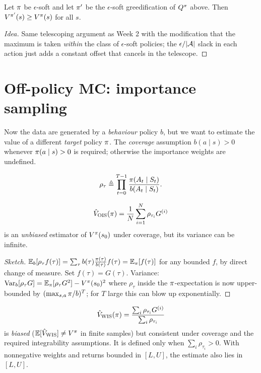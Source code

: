 \documentclass[11pt,oneside]{scrbook}
\begin{document}
\begin{theorem}
Let $\pi$ be $\epsilon$-soft and let $\pi'$ be the $\epsilon$-soft
greedification of $Q^\pi$ above. Then $V^{\pi'}(s) \ge V^\pi(s)$
for all $s$.
\end{theorem}

\begin{proof}[Idea]
Same telescoping argument as Week 2 with the modification that the maximum is
taken \emph{within} the class of $\epsilon$-soft policies; the
$\epsilon/|\mathcal{A}|$ slack in each action just adds a constant offset that
cancels in the telescope. \qedhere
\end{proof}

\section{Off-policy MC: importance sampling}

Now the data are generated by a \emph{behaviour} policy $b$, but we want to
estimate the value of a different \emph{target} policy $\pi$. The
\emph{coverage} assumption $b(a\mid s)>0$ whenever $\pi(a\mid s)>0$ is
required; otherwise the importance weights are undefined.

\begin{definition}
\[
\rho_\tau \triangleq \prod_{t=0}^{T-1} \frac{\pi(A_t\mid S_t)}{b(A_t\mid S_t)}.
\]
\end{definition}

\begin{theorem}[Ordinary IS]
\[
\hat V_{\mathrm{OIS}}(\pi)
   = \frac{1}{N}\sum_{i=1}^N \rho_{\tau_i} G^{(i)}
\]
is an \emph{unbiased} estimator of $V^\pi(s_0)$ under coverage, but its
variance can be infinite.
\end{theorem}

\begin{proof}[Sketch]
$\mathbb{E}_b[\rho_\tau f(\tau)] = \sum_\tau b(\tau) \frac{\pi(\tau)}{b(\tau)} f(\tau)
= \mathbb{E}_\pi[f(\tau)]$ for any bounded $f$, by direct change of measure.
Set $f(\tau)=G(\tau)$. Variance:
$\operatorname{Var}_b[\rho_\tau G] = \mathbb{E}_\pi[\rho_\tau G^2] - V^\pi(s_0)^2$ where
$\rho_\tau$ inside the $\pi$-expectation is now upper-bounded by
$(\max_{s,a} \pi/b)^T$; for $T$ large this can blow up exponentially. \qedhere
\end{proof}

\begin{theorem}[Weighted IS]
\[
\hat V_{\mathrm{WIS}}(\pi) = \frac{\sum_i \rho_{\tau_i} G^{(i)}}{\sum_i \rho_{\tau_i}}
\]
is \emph{biased} ($\mathbb{E}[\hat V_{\mathrm{WIS}}] \ne V^\pi$ in finite samples)
but consistent under coverage and the required integrability assumptions.
It is defined only when $\sum_i\rho_{\tau_i}>0$. With nonnegative weights
and returns bounded in $[L,U]$, the estimate also lies in $[L,U]$.
\end{theorem}
\end{document}
